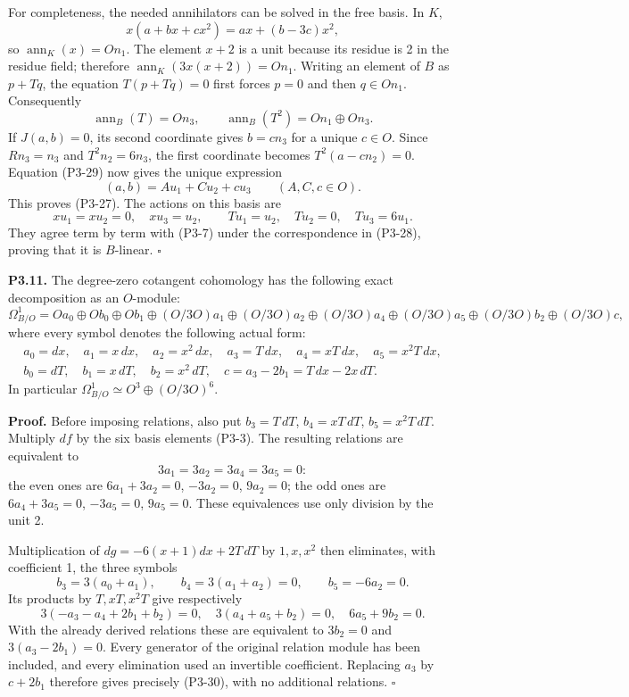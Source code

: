 \documentclass[
]{article}
\begin{document}
For completeness, the needed annihilators can be solved in the free
basis. In \(K\), \[
x(a+bx+cx^2)=ax+(b-3c)x^2,
\] so \(\operatorname{ann}_K(x)=On_1\). The element \(x+2\) is a unit
because its residue is 2 in the residue field; therefore
\(\operatorname{ann}_K(3x(x+2))=On_1\). Writing an element of \(B\) as
\(p+Tq\), the equation \(T(p+Tq)=0\) first forces \(p=0\) and then
\(q\in On_1\). Consequently \[
\operatorname{ann}_B(T)=On_3,\qquad
\operatorname{ann}_B(T^2)=On_1\oplus On_3.
\tag{P3-29}
\] If \(J(a,b)=0\), its second coordinate gives \(b=cn_3\) for a unique
\(c\in O\). Since \(Rn_3=n_3\) and \(T^2n_2=6n_3\), the first coordinate
becomes \(T^2(a-cn_2)=0\). Equation (P3-29) now gives the unique
expression \[
(a,b)=Au_1+Cu_2+cu_3\qquad(A,C,c\in O).
\] This proves (P3-27). The actions on this basis are \[
xu_1=xu_2=0,\quad xu_3=u_2,\qquad
Tu_1=u_2,\quad Tu_2=0,\quad Tu_3=6u_1.
\] They agree term by term with (P3-7) under the correspondence in
(P3-28), proving that it is \(B\)-linear. \(\square\)

\textbf{P3.11.} The degree-zero cotangent cohomology has the following
exact decomposition as an \(O\)-module: \[
\Omega^1_{B/O}
=Oa_0\oplus Ob_0\oplus Ob_1
\oplus(O/3O)a_1\oplus(O/3O)a_2
\oplus(O/3O)a_4\oplus(O/3O)a_5
\oplus(O/3O)b_2\oplus(O/3O)c,
\tag{P3-30}
\] where every symbol denotes the following actual form: \[
\begin{gathered}
a_0=dx,\quad a_1=x\,dx,\quad a_2=x^2\,dx,\quad
a_3=T\,dx,\quad a_4=xT\,dx,\quad a_5=x^2T\,dx,\\
b_0=dT,\quad b_1=x\,dT,\quad b_2=x^2\,dT,\quad
c=a_3-2b_1=T\,dx-2x\,dT.
\end{gathered}
\tag{P3-31}
\] In particular \(\Omega^1_{B/O}\simeq O^3\oplus(O/3O)^6\).

\textbf{Proof.} Before imposing relations, also put \(b_3=T\,dT\),
\(b_4=xT\,dT\), \(b_5=x^2T\,dT\). Multiply \(df\) by the six basis
elements (P3-3). The resulting relations are equivalent to \[
3a_1=3a_2=3a_4=3a_5=0:
\] the even ones are \(6a_1+3a_2=0\), \(-3a_2=0\), \(9a_2=0\); the odd
ones are \(6a_4+3a_5=0\), \(-3a_5=0\), \(9a_5=0\). These equivalences
use only division by the unit 2.

Multiplication of \(dg=-6(x+1)dx+2T\,dT\) by \(1,x,x^2\) then
eliminates, with coefficient 1, the three symbols \[
b_3=3(a_0+a_1),\qquad
b_4=3(a_1+a_2)=0,\qquad b_5=-6a_2=0.
\] Its products by \(T,xT,x^2T\) give respectively \[
3(-a_3-a_4+2b_1+b_2)=0,\quad
3(a_4+a_5+b_2)=0,\quad
6a_5+9b_2=0.
\] With the already derived relations these are equivalent to \(3b_2=0\)
and \(3(a_3-2b_1)=0\). Every generator of the original relation module
has been included, and every elimination used an invertible coefficient.
Replacing \(a_3\) by \(c+2b_1\) therefore gives precisely (P3-30), with
no additional relations. \(\square\)
\end{document}
